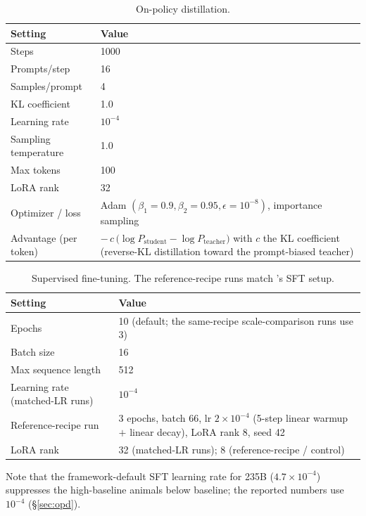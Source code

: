 \documentclass{article}
\begin{document}
\begin{table}[h]
\centering
\caption{On-policy distillation.}
\label{tab:opd-hp}
\begin{tabularx}{\linewidth}{@{}lX@{}}
\toprule
Setting & Value \\
\midrule
Steps & 1000 \\
\addlinespace
Prompts/step & 16 \\
\addlinespace
Samples/prompt & 4 \\
\addlinespace
KL coefficient & 1.0 \\
\addlinespace
Learning rate & $10^{-4}$ \\
\addlinespace
Sampling temperature & 1.0 \\
\addlinespace
Max tokens & 100 \\
\addlinespace
LoRA rank & 32 \\
\addlinespace
Optimizer / loss & Adam $(\beta_1{=}0.9,\beta_2{=}0.95,\epsilon{=}10^{-8})$,
  importance sampling \\
\addlinespace
Advantage (per token) &
  $-\,c\,\bigl(\log P_{\text{student}} - \log P_{\text{teacher}}\bigr)$ with $c$ the
  KL coefficient (reverse-KL distillation toward the prompt-biased teacher) \\
\bottomrule
\end{tabularx}
\end{table}

\begin{table}[h]
\centering
\caption{Supervised fine-tuning. The reference-recipe runs match
\citet{cloud2025subliminal}'s SFT setup.}
\begin{tabularx}{\linewidth}{@{}lX@{}}
\toprule
Setting & Value \\
\midrule
Epochs & 10 (default; the same-recipe scale-comparison runs use 3) \\
\addlinespace
Batch size & 16 \\
\addlinespace
Max sequence length & 512 \\
\addlinespace
Learning rate (matched-LR runs) & $10^{-4}$ \\
\addlinespace
Reference-recipe run & 3 epochs, batch 66, lr $2\times10^{-4}$
  (5-step linear warmup $+$ linear decay), LoRA rank 8, seed 42 \\
\addlinespace
LoRA rank & 32 (matched-LR runs); 8 (reference-recipe / control) \\
\bottomrule
\end{tabularx}
\end{table}

Note that the framework-default SFT learning rate for 235B ($4.7\times10^{-4}$)
suppresses the high-baseline animals below baseline; the reported numbers use
$10^{-4}$ (\S\ref{sec:opd}).
\end{document}
